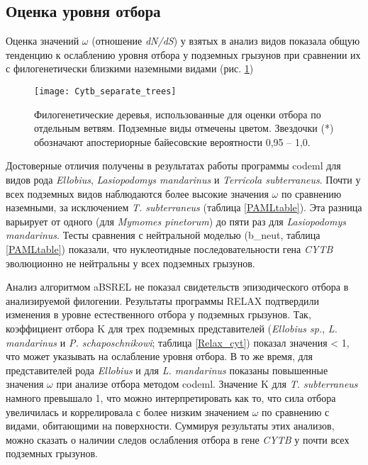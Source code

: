 \subsection{Оценка уровня отбора}
Оценка значений $\omega$ (отношение \textit{dN/dS}) у взятых в анализ видов показала общую тенденцию к ослаблению уровня отбора у подземных грызунов при сравнении их с филогенетически близкими наземными видами (рис. \ref{Tree4Selection})


\begin{figure}[h!]
	\begin{center}
		\texttt{[image: Cytb\_separate\_trees]}
	\end{center}
	\caption{Филогенетические деревья, использованные для оценки отбора по отдельным ветвям. Подземные виды отмечены цветом. Звездочки (*) обозначают апостериорные байесовские вероятности 0,95 -- 1,0.} \label{Tree4Selection}
\end{figure}


 Достоверные отличия получены в результатах работы программы codeml для видов рода \textit{Ellobius}, \textit{Lasiopodomys mandarinus} и \textit{Terricola subterraneus}. Почти у всех подземных видов наблюдаются более высокие значения $\omega$ по сравнению наземными, за исключением \textit{T. subterraneus} (таблица \ref{PAMLtable}). Эта разница варьирует от одного (для \textit{Mymomes pinetorum}) до пяти раз для \textit{Lasiopodomys mandarinus}. Тесты сравнения с нейтральной моделью (b\_neut, таблица \ref{PAMLtable}) показали, что нуклеотидные последовательности гена \textit{CYTB} эволюционно не нейтральны у всех подземных грызунов. 

Анализ алгоритмом aBSREL не показал свидетельств эпизодического отбора в анализируемой филогении. Результаты программы RELAX подтвердили изменения в уровне естественного отбора у подземных грызунов. Так, коэффициент отбора K для трех подземных представителей (\textit{Ellobius sp.}, \textit{L. mandarinus} и \textit{P. schaposchnikowi}; таблица \ref{Relax_cyt}) показал значения < 1, что может указывать на ослабление уровня отбора. В то же время, для представителей рода \textit{Ellobius} и для \textit{L. mandarinus} показаны повышенные значения $\omega$ при анализе отбора методом codeml. Значение K для \textit{T. subterraneus} намного превышало 1, что можно интерпретировать как то, что сила отбора увеличилась и коррелировала с более низким значением $\omega$ по сравнению с видами, обитающими на поверхности. Суммируя результаты этих анализов, можно сказать о наличии следов ослабления отбора в гене \textit{CYTB} у почти всех подземных грызунов.


